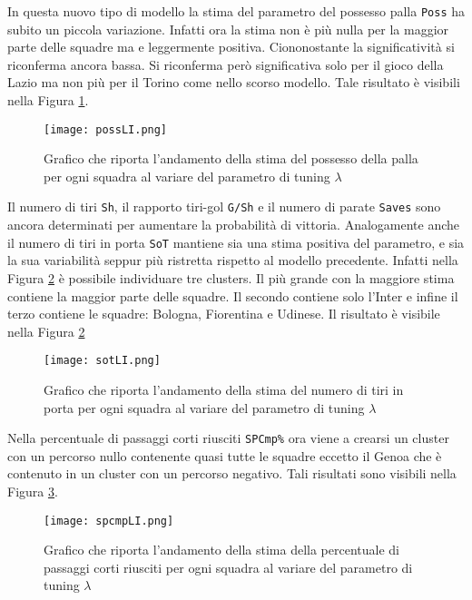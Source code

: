 In questa nuovo tipo di modello la stima del parametro del possesso palla \texttt{Poss} ha subito un piccola variazione. Infatti ora la stima non è più nulla per la maggior parte delle squadre ma e leggermente positiva. Ciononostante la significatività si riconferma ancora bassa. Si riconferma però significativa solo per il gioco della Lazio ma non più per il Torino come nello scorso modello. Tale risultato è visibili nella Figura \ref{fig:possLI}.\\
\begin{figure}[]
	\begin{center}
		\texttt{[image: possLI.png]}
		\caption{Grafico che riporta l'andamento della stima del possesso della palla per ogni squadra al variare del parametro di tuning $\lambda$} \label{fig:possLI}
	\end{center}
\end{figure}
Il numero di tiri \texttt{Sh}, il rapporto tiri-gol \texttt{G/Sh} e il numero di parate \texttt{Saves} sono ancora determinati per aumentare la probabilità di vittoria. Analogamente anche il numero di tiri in porta \texttt{SoT} mantiene sia una stima positiva del parametro, e sia la sua variabilità seppur più ristretta rispetto al modello precedente. Infatti nella Figura \ref{fig:sotLI} è possibile individuare tre clusters. Il più grande con la maggiore stima contiene la maggior parte delle squadre. Il secondo contiene solo l'Inter e infine il terzo contiene le squadre: Bologna, Fiorentina e Udinese. Il risultato è visibile nella Figura \ref{fig:sotLI} \\
\begin{figure}[htbp]
	\begin{center}
		\texttt{[image: sotLI.png]}
		\caption{Grafico che riporta l'andamento della stima del numero di tiri in porta per ogni squadra al variare del parametro di tuning $\lambda$} \label{fig:sotLI}
	\end{center}
\end{figure}
Nella percentuale di passaggi corti riusciti \texttt{SPCmp\%} ora viene a crearsi un cluster con un percorso nullo contenente quasi tutte le squadre eccetto il Genoa che è contenuto in un cluster con un percorso negativo. Tali risultati sono visibili nella Figura \ref{fig:spcmpLI}.\\
\begin{figure}[htbp]
	\begin{center}
		\texttt{[image: spcmpLI.png]}
		\caption{Grafico che riporta l'andamento della stima della percentuale di passaggi corti riusciti per ogni squadra al variare del parametro di tuning $\lambda$} \label{fig:spcmpLI}
	\end{center}
\end{figure}
